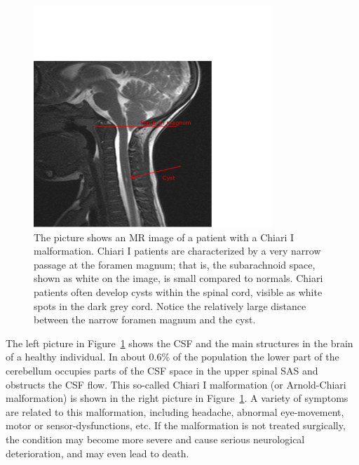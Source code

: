 \begin{figure}\begin{center}
\includegraphics[width=0.8\textwidth]{chapters/hentschel/pdf/ChiariImage2.pdf}
\caption{The picture shows an MR image of a patient with a Chiari I malformation. Chiari I patients are characterized by a very narrow passage at
the foramen magnum; that is, the subarachnoid space, shown as white on
the image, is small compared to normals. Chiari patients often develop
cysts within the spinal cord, visible as white spots in the dark grey
cord. Notice the relatively large distance between the narrow foramen
magnum and the cyst.  }

\label{fig:anatomy}
\end{center}\end{figure}

The left picture in Figure~\ref{fig:anatomy} shows the CSF and the
main structures in the brain of a healthy individual. In about 0.6\%
of the population the lower part of the cerebellum occupies parts of
the CSF space in the upper spinal SAS and obstructs the CSF flow. This
so-called Chiari I malformation  (or
Arnold-Chiari malformation) is shown in the right picture in
Figure~\ref{fig:anatomy}. A variety of symptoms are related to this
malformation, including headache, abnormal eye-movement, motor or
sensor-dysfunctions, etc. If the malformation is not treated
surgically, the condition may become more severe and cause serious
neurological deterioration, and may even lead to death.

